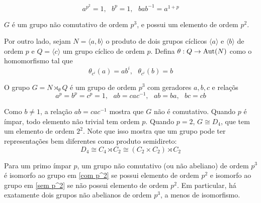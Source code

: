 	\begin{equation}
	\label{com p^2}
	a^{p^2} = 1, \text{ }b^p=1, \text{ }bab^{-1} = a^{1+p}
	\end{equation}
	\par\vspace{0.3cm} $G$ é um grupo não comutativo de ordem $p^3$, e possui um elemento de ordem $p^2$.
	\par\vspace{0.3cm} Por outro lado, sejam $N = \langle a,b\rangle$ o produto de dois grupos cíclicos $\langle a \rangle$ e $\langle b \rangle$ de ordem $p$ e $Q = \langle c \rangle$ um grupo cíclico de ordem $p$. Defina $\theta: Q\to\operatorname{Aut}(N)$ como o homomorfismo tal que
	\begin{equation*}
	\theta_{c^i}(a) = ab^i, \text{ }\theta_{c^i}(b) = b
	\end{equation*}
	\par\vspace{0.3cm} O grupo $G = N\rtimes_{\theta} Q$ é um grupo de ordem $p^3$ com geradores $a,b,c$ e relaçõs
	\begin{equation}
	\label{sem p^2}
	a^p=b^p=c^p=1, \text{ }ab = cac^{-1}, \text{ }ab = ba, \text{ }bc = cb 
	\end{equation}
	\par\vspace{0.3cm} Como $b\neq 1$, a relação $ab = cac^{-1}$ mostra que $G$ não é comutativo. Quando $p$ é ímpar, todo elemento não trivial tem ordem $p$. Quando $p=2$, $G\cong D_4$, que tem um elemento de ordem $2^2$. Note que isso mostra que um grupo pode ter representações bem diferentes como produto semidireto:
	\begin{equation*}
	D_4\cong C_4\rtimes C_2\cong (C_2\times C_2)\rtimes C_2
	\end{equation*}
	\par\vspace{0.3cm} Para um primo ímpar $p$, um grupo não comutativo (ou não abeliano) de ordem $p^3$ é isomorfo ao grupo em \eqref{com p^2} se possui elemento de ordem $p^2$ e isomorfo ao grupo em \eqref{sem p^2} se não possui elemento de ordem $p^2$. Em particular, há exatamente dois grupos não abelianos de ordem $p^3$, a menos de isomorfismo.